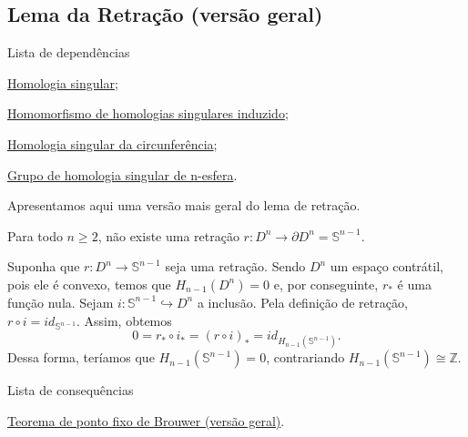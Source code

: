 \subsection{Lema da Retração (versão geral)} %
\label{lema-de-retracao-geral-prop}
\begin{titlemize}{Lista de dependências}
    \item \hyperref[homologia-singular-def]{Homologia singular};\\
    \item \hyperref[homomorfismo-de-homologias-singulares-induzido-prop]{Homomorfismo de homologias singulares induzido};\\
    \item \hyperref[homologia-singular-de-S1-prop]{Homologia singular da circunferência};\\
    \item \hyperref[grupo-de-homologia-singular-de-n-esfera-prop]{Grupo de homologia singular de n-esfera}.
\end{titlemize}

Apresentamos aqui uma versão mais geral do lema de retração.

\begin{lemma}
	Para todo $n\ge 2$, não existe uma retração $r:D^n \longrightarrow \partial D^n = \mathbb{S}^{n-1}$.
\end{lemma}

\begin{dem}
Suponha que $r:D^{n} \longrightarrow \mathbb{S}^{n-1}$ seja uma retração. Sendo $D^n$ um espaço contrátil, pois ele é convexo, temos que $H_{n-1}(D^n)=0$ e, por conseguinte, $r_*$ é uma função nula. Sejam $i:\mathbb{S}^{n-1}\hookrightarrow D^n$ a inclusão. Pela definição de retração, $r\circ i=id_{\mathbb{S}^{n-1}}$. Assim, obtemos 
\[0=r_*\circ i_*=(r\circ i)_*=id_{H_{n-1}(\mathbb{S}^{n-1})}.\]
Dessa forma, teríamos que $H_{n-1}(\mathbb{S}^{n-1})=0$, contrariando $H_{n-1}(\mathbb{S}^{n-1})\cong \mathbb{Z}$.
\end{dem}

\begin{titlemize}{Lista de consequências}
    \item \hyperref[teorema-de-ponto-fixo-de-brouwer-geral-prop]{Teorema de ponto fixo de Brouwer (versão geral)}.
\end{titlemize}
